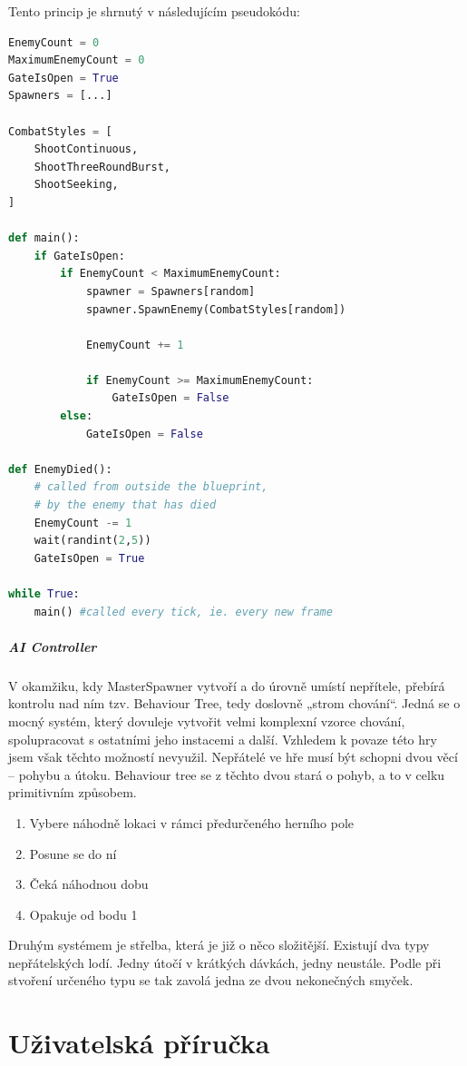 \documentclass[12pt,a4paper,hidelinks]{article}
\begin{document}
Tento princip je shrnutý v následujícím pseudokódu:\\
\begin{lstlisting}[language=Python]
EnemyCount = 0
MaximumEnemyCount = 0
GateIsOpen = True
Spawners = [...]

CombatStyles = [
	ShootContinuous,
	ShootThreeRoundBurst,
	ShootSeeking,
]

def main():
	if GateIsOpen:
		if EnemyCount < MaximumEnemyCount:
			spawner = Spawners[random]
			spawner.SpawnEnemy(CombatStyles[random])
			
			EnemyCount += 1
			
			if EnemyCount >= MaximumEnemyCount:
				GateIsOpen = False
		else:
			GateIsOpen = False

def EnemyDied():
	# called from outside the blueprint,
	# by the enemy that has died
	EnemyCount -= 1
	wait(randint(2,5))
	GateIsOpen = True
	
while True: 
	main() #called every tick, ie. every new frame

\end{lstlisting}

\subsubsection{AI Controller}
V okamžiku, kdy MasterSpawner vytvoří a do úrovně umístí nepřítele, přebírá kontrolu nad ním tzv. Behaviour Tree, tedy doslovně „strom chování“. Jedná se o mocný systém, který dovuleje vytvořit velmi komplexní vzorce chování, spolupracovat s ostatními jeho instacemi a další. Vzhledem k povaze této hry jsem však těchto možností nevyužil.
Nepřátelé ve hře musí být schopni dvou věcí – pohybu a útoku. Behaviour tree se z těchto dvou stará o pohyb, a to v celku primitivním způsobem.
\begin{enumerate}
	\item Vybere náhodně lokaci v rámci předurčeného herního pole
	\item Posune se do ní
	\item Čeká náhodnou dobu
	\item Opakuje od bodu 1
\end{enumerate}
Druhým systémem je střelba, která je již o něco složitější.
Existují dva typy nepřátelských lodí. Jedny útočí v krátkých dávkách, jedny neustále. Podle při stvoření určeného typu se tak zavolá jedna ze dvou nekonečných smyček.


\clearpage
\part{Uživatelská příručka}
\end{document}
